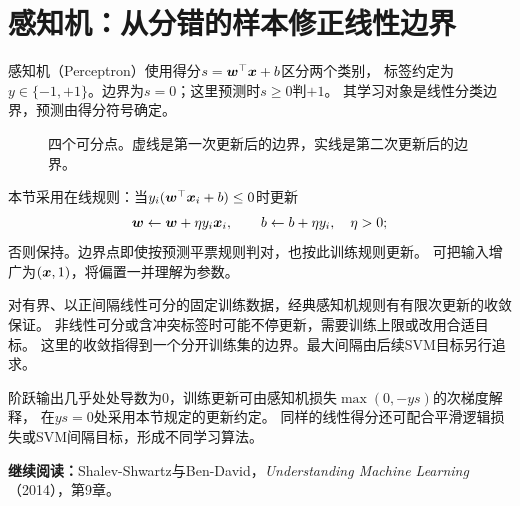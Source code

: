 \section{感知机：从分错的样本修正线性边界}
\label{sec:linear-perceptron}
感知机（Perceptron）使用得分$s=\boldsymbol{w}^\top\boldsymbol{x}+b$区分两个类别，
标签约定为$y\in\{-1,+1\}$。边界为$s=0$；这里预测时$s\geq0$判$+1$。
其学习对象是线性分类边界，预测由得分符号确定。

\begin{figure}[htbp]
\centering
\caption{四个可分点。虚线是第一次更新后的边界，实线是第二次更新后的边界。}
\par\smallskip
{}
\end{figure}

本节采用在线规则：当$y_i(\boldsymbol{w}^\top\boldsymbol{x}_i+b)\leq0$时更新
\[
 \boldsymbol{w}\leftarrow\boldsymbol{w}+\eta y_i\boldsymbol{x}_i,\qquad
 b\leftarrow b+\eta y_i,\quad\eta>0;
\]
否则保持。边界点即使按预测平票规则判对，也按此训练规则更新。
可把输入增广为$(\boldsymbol{x},1)$，将偏置一并理解为参数。

\begin{keyidea}[感知机的收敛条件]
对有界、以正间隔线性可分的固定训练数据，经典感知机规则有有限次更新的收敛保证。
非线性可分或含冲突标签时可能不停更新，需要训练上限或改用合适目标。
这里的收敛指得到一个分开训练集的边界。最大间隔由后续SVM目标另行追求。
\end{keyidea}

阶跃输出几乎处处导数为0，训练更新可由感知机损失$\max(0,-ys)$的次梯度解释，
在$ys=0$处采用本节规定的更新约定。
同样的线性得分还可配合平滑逻辑损失或SVM间隔目标，形成不同学习算法。


\begingroup\small
\noindent\textbf{继续阅读：}Shalev-Shwartz与Ben-David，\textit{Understanding Machine Learning}（2014），第9章。
\par\endgroup
